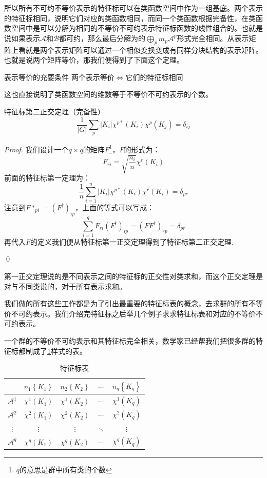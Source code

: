 所以所有不可约不等价表示的特征标可以在类函数空间中作为一组基底。两个表示的特征标相同，说明它们对应的类函数相同，而同一个类函数根据完备性，在类函数空间中是可以分解为相同的不等价不可约表示特征标函数的线性组合的。也就是说如果表示$\mathscr{A}$和$\mathscr{B}$都可约，那么最后分解为的$\bigoplus_p m_p\mathscr{A}^p$形式完全相同。从表示矩阵上看就是两个表示矩阵可以通过一个相似变换变成有同样分块结构的表示矩阵。也就是说两个矩阵等价，那我们便得到了下面这个定理。
\begin{theorem}{表示等价的充要条件}
	两个表示等价$\iff$它们的特征标相同
\end{theorem}
这也直接说明了类函数空间的维数等于不等价不可约表示的个数。
\begin{theorem}{特征标第二正交定理（完备性）}
	\begin{equation}
		\frac{1}{|G|}\sum_{p}|K_i|\chi^{p*}(K_i)\chi^{p}(K_j)=\delta_{ij}
	\end{equation}
\end{theorem}
\begin{proof}
	我们设计一个$q\times q$的矩阵$F$\footnote{$q$的意思是群中所有类的个数}，$F$的形式为：
	\[F_{ri}=\sqrt{\frac{n_i}{n}}\chi^r(K_i)\]
	前面的特征标第一定理为：
	\[\frac{1}{n}\sum_{i=1}^n|K_i|\chi^{p*}(K_i)\chi^r(K_i)=\delta_{pr}\]
	注意到$F*_{pi}=(F^\dagger)_{ip}$，上面的等式可以写成：
	\[\sum_{i=1}^q F_{ri}(F^\dagger)_{ip}=(FF^\dagger)_{rp}=\delta_{pr}\]
	再代入$F$的定义我们便从特征标第一正交定理得到了特征标第二正交定理.
	
	\qed
\end{proof}

第一正交定理说的是不同表示之间的特征标的正交性对类求和，而这个正交定理是对与不同类说的，对于所有表示求和。

我们做的所有这些工作都是为了引出最重要的特征标表的概念，去求群的所有不等价不可约表示。我们介绍完特征标之后举几个例子求求特征标表和对应的不等价不可约表示。

一个群的不等价不可约表示和其特征标完全相关，数学家已经帮我们把很多群的特征标都制成了\ref{tab:D.2}样式的表。
\begin{table}[h]
	\centering
	\caption{特征标表}
	\label{tab:D.2}
	\begin{tabular}{c|c|c|c|c} 
		\hline
		& $n_1\left\{K_1\right\}$ & $n_2\left\{K_2\right\}$ & $\cdots$ & $n_q\left\{K_q\right\}$ \\
		\hline$\mathscr{A}^1$ & $\chi^1\left(K_1\right)$ & $\chi^1\left(K_2\right)$ & $\cdots$ & $\chi^1\left(K_q\right)$ \\
		\hline$\mathscr{A}^2$ & $\chi^2\left(K_1\right)$ & $\chi^2\left(K_2\right)$ & $\cdots$ & $\chi^2\left(K_q\right)$ \\
		\hline$\vdots$ & $\vdots$ & $\vdots$ & $\ddots$ & $\vdots$ \\
		\hline$\mathscr{A}^q$ & $\chi^q\left(K_1\right)$ & $\chi^q\left(K_2\right)$ & $\cdots$ & $\chi^q\left(K_q\right)$ \\
		\hline
	\end{tabular}
\end{table}

